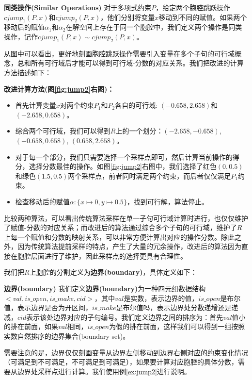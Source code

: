 \begin{example}
\begin{definition}{\textbf{同类操作(Similar Operations)}}
    对于多项式约束$P$，给定两个胞腔跳跃操作$cjump_1(P, x)$和$cjump_2(P, x)$，他们分别将变量$x$移动到不同的赋值。如果两个移动后的赋值$\alpha_1$和$\alpha_2$在解空间上存在于同一个胞腔中，我们定义两个操作是同类操作，记作$cjump_1(P, x) \sim cjump_2(P, x)$。
\end{definition}
从图中可以看出，更好地刻画胞腔跳跃操作需要引入变量在多个子句的可行域概念，总和所有可行域后才能可以得到可行域-分数的对应关系。我们把改进的计算方法描述如下：

\textbf{改进计算方法(图\ref{fig:jump2}右图)：}
\begin{itemize}
    \item 首先计算变量$x$对两个约束$P_1$和$P_2$各自的可行域: $(-0.658, 2.658)$和$(-2.658, 0.658)$。
    \item 综合两个可行域，我们可以得到$R$上的一个划分：$(-2.658, -0.658)$, $(-0.658, 0.658)$, $(0.658, 2.658)$。
    \item 对于每一个部分，我们只需要选择一个采样点即可，然后计算当前操作的得分，选择分数最佳的操作。如图\ref{fig:jump2}右图中，我们选择了红色$(0, 0.5)$和绿色$(1.5, 0.5)$两个采样点，前者同时满足两个约束，而后者仅仅满足$P_1$约束。
    \item 检查移动后的赋值$\alpha: \{x \mapsto 0, y \mapsto 0.5\}$，找到可行解，算法停止。
\end{itemize}
比较两种算法，可以看出传统算法采样在单一子句可行域计算时进行，也仅仅维护了赋值-分数的对应关系；而改进后的算法通过综合多个子句的可行域，维护了$R$上每一个赋值和分数的映射关系，可以非常方便计算出对应的操作分数。除此之外，因为传统算法提前采样的特点，产生了大量的冗余操作，改进后的算法因为直接在胞腔层面进行了维护，因此采样点的选择更具有合理性。
\end{example}

我们把$R$上胞腔的分割定义为\textbf{边界(boundary)}，具体定义如下：
\begin{definition}{\textbf{边界(boundary)}}
我们定义\textbf{边界(boundary)}为一种四元组数据结构$<val, is\_open, is\_make, cid>$，其中$val$是实数，表示边界的值，$is\_open$是布尔值，表示边界是否为开区间，$is\_make$是布尔值吗，表示边界处分数递增还是递减，$cid$表示该处边界对应的子句编号。我们定义边界之间的排序为：首先$val$值小的排在前面，如果$val$相同，$is\_open$为假的排在前面，这样我们可以得到一组按照实数自然排序的边界集合(boundary set)。
\end{definition}
需要注意的是，边界仅仅刻画变量从边界左侧移动到边界右侧对应的约束变化情况（可满足到不可满足，不可满足到可满足），如果要计算对应胞腔的具体分数，需要从边界处采样点进行计算。我们使用例\ref{ex:jump2}进行说明。

